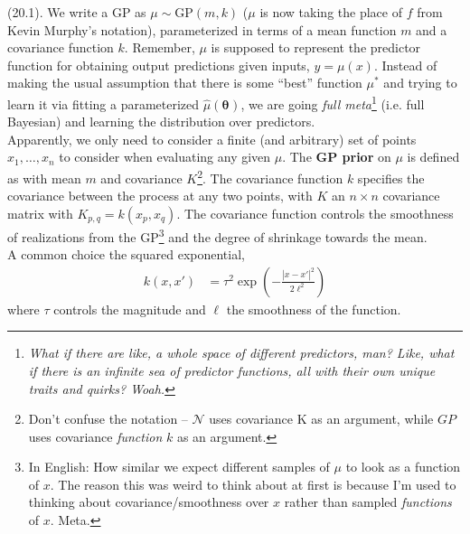\documentclass[11pt]{article}
\renewcommand\vec[2][]{\bm{#2}_{#1}}
\newcommand\myspace[1][]{\vspace{#1\bigskipamount}}
\newcommand\p{\Needspace{10\baselineskip} \noindent}
\begin{document}
\myspace
\p {} (20.1). We write a GP as $\mu \sim \text{GP}(m, k)$ ($\mu$ is now taking the place of $f$ from Kevin Murphy's notation), parameterized in terms of a mean function $m$ and a covariance function $k$. Remember, $\mu$ is supposed to represent the predictor function for obtaining output predictions given inputs, $y = \mu(x)$. Instead of making the usual assumption that there is some ``best'' function $\mu^*$ and trying to learn it via fitting a parameterized $\hat{\mu}(\vec \theta)$, we are going \textit{full meta}\footnote{\textit{What if there are like, a whole space of different predictors, man? Like, what if there is an infinite sea of predictor functions, all with their own unique traits and quirks? Woah.}} (i.e. full Bayesian) and learning the distribution over predictors. \\

Apparently, we only need to consider a finite (and arbitrary) set of points $x_1, \ldots, x_n$ to consider when evaluating any given $\mu$. The \textbf{GP prior} on $\mu$ is defined as 
with mean $m$ and covariance $K$\footnote{Don't confuse the notation -- $\mathcal{N}$ uses covariance K as an argument, while $GP$ uses covariance \textit{function} $k$ as an argument.}. The covariance function $k$ specifies the covariance between the process at any two points, with $K$ an $n \times n$ covariance matrix with $K_{p, q} = k(x_p, x_q)$. The covariance function controls the smoothness of realizations from the GP\footnote{In English: How similar we expect different samples of $\mu$ to look as a function of $x$. The reason this was weird to think about at first is because I'm used to thinking about covariance/smoothness over $x$ rather than sampled \textit{functions} of $x$. Meta.} and the degree of shrinkage towards the mean. \\

A common choice the squared exponential,
\begin{align}
	k(x, x')
		&= \tau^2 \exp\left( - \frac{  |x - x'|^2 }{ 2 \ell^2 } \right)
\end{align} 
where $\tau$ controls the magnitude and $\ell$ the smoothness of the function. 






\label{Gaussian Processes for Machine Learning}
\end{document}
